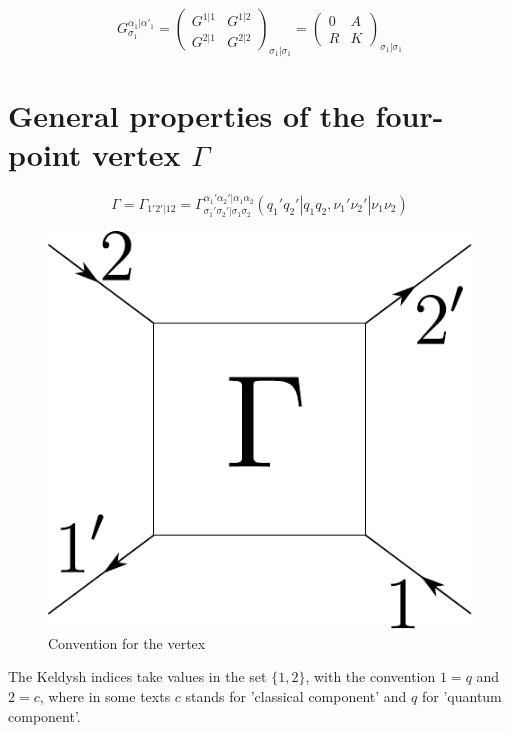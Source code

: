 \documentclass[12pt,a4paper,roman]{article}
\begin{document}
\begin{equation}
G^{\alpha_1|\alpha'_1}_{\sigma_1} =
\begin{pmatrix}
G^{1|1} & G^{1|2} \\
G^{2|1} & G^{2|2}
\end{pmatrix}_{\sigma_1|\sigma_1} = \begin{pmatrix}
0 & A \\ R & K
\end{pmatrix}_{\sigma_1|\sigma_1}
\end{equation}


\section*{General properties of the four-point vertex $\Gamma$}

\begin{equation}
    \Gamma = \Gamma_{1'2'|12} = \Gamma_{\sigma_1'\sigma_2'|\sigma_1\sigma_2}^{\alpha_1'\alpha_2'|\alpha_1\alpha_2}(q_1'q_2'|q_1q_2, \nu_1'\nu_2'|\nu_1\nu_2)
\end{equation}
\begin{figure}[H]
\centering
\includegraphics[scale=0.65]{vertex.pdf}
\caption{Convention for the vertex}
\label{fig:vertex}
\end{figure}
The Keldysh indices take values in the set $\{1,2\}$, with the convention $1 = q$ and $2=c$, where in some texts $c$ stands for 'classical component' and $q$ for 'quantum component'.
\end{document}
